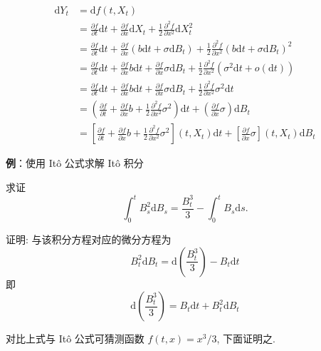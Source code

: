 \documentclass[openany]{ctexbook}
\theoremstyle{kaiti}
\theoremstyle{normal}
\begin{document}
\begin{equation}
  \begin{aligned}
    \mathrm{d}Y_t&=\mathrm{d}f(t,X_t)\\
    &=\frac{\partial f}{\partial t}\mathrm{d}t+\frac{\partial f}{\partial x}\mathrm{d}X_t+\frac{1}{2}\frac{\partial^2 f}{\partial x^2}\mathrm{d}X_t^2\\
    &=\frac{\partial f}{\partial t}\mathrm{d}t+\frac{\partial f}{\partial x}(b\mathrm{d}t+\sigma\mathrm{d}B_t)+\frac{1}{2}\frac{\partial^2 f}{\partial x^2}(b\mathrm{d}t+\sigma\mathrm{d}B_t)^2\\
    &=\frac{\partial f}{\partial t}\mathrm{d}t+\frac{\partial f}{\partial x}b\mathrm{d}t+\frac{\partial f}{\partial x}\sigma\mathrm{d}B_t+\frac{1}{2}\frac{\partial^2 f}{\partial x^2}(\sigma^2\mathrm{d}t+o(\mathrm{d}t))\\
    &=\frac{\partial f}{\partial t}\mathrm{d}t+\frac{\partial f}{\partial x}b\mathrm{d}t+\frac{\partial f}{\partial x}\sigma\mathrm{d}B_t+\frac{1}{2}\frac{\partial^2 f}{\partial x^2}\sigma^2\mathrm{d}t\\
    &=\left(\frac{\partial f}{\partial t}+\frac{\partial f}{\partial x}b+\frac{1}{2}\frac{\partial^2 f}{\partial x^2}\sigma^2\right)\mathrm{d}t+\left(\frac{\partial f}{\partial x}\sigma\right)\mathrm{d}B_t\\
    &=\left[\frac{\partial f}{\partial t}+\frac{\partial f}{\partial x}b+\frac{1}{2}\frac{\partial^2 f}{\partial x^2}\sigma^2\right](t,X_t)\mathrm{d}t+\left[\frac{\partial f}{\partial x}\sigma\right](t,X_t)\mathrm{d}B_t
  \end{aligned}
\end{equation}

\textbf{例}：使用 It\^o 公式求解 It\^o 积分

求证
\begin{equation}
  \int_0^tB_s^2\mathrm{d}B_s=\frac{B_t^3}{3}-\int_0^tB_s\mathrm{d}s.
\end{equation}

证明: 与该积分方程对应的微分方程为
\begin{equation}
  B_t^2\mathrm{d}B_t=\mathrm{d}\left(\frac{B_t^3}{3}\right)-B_t\mathrm{d}t
\end{equation}
即
\begin{equation}
  \mathrm{d}\left(\frac{B_t^3}{3}\right)=B_t\mathrm{d}t+B_t^2\mathrm{d}B_t
\end{equation}

对比上式与 It\^o 公式可猜测函数 $f(t,x)=x^3/3$, 下面证明之.
\end{document}
